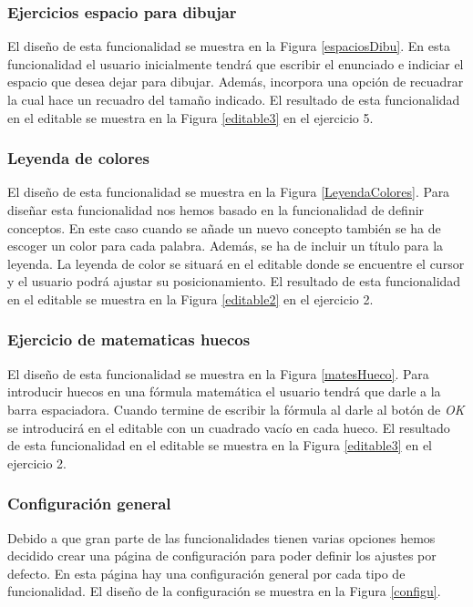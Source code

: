 \subsubsection{Ejercicios espacio para dibujar}
El diseño de esta funcionalidad se muestra en la Figura \ref{espaciosDibu}. En esta funcionalidad el usuario inicialmente tendrá que escribir el enunciado e indiciar el espacio que desea dejar para dibujar. Además, incorpora una opción de recuadrar la cual hace un recuadro del tamaño indicado. El resultado de esta funcionalidad en el editable se muestra en la Figura \ref{editable3} en el ejercicio 5.

\subsubsection{Leyenda de colores}
El diseño de esta funcionalidad se muestra en la Figura \ref{LeyendaColores}. Para diseñar esta funcionalidad nos hemos basado en la funcionalidad de definir conceptos. En este caso cuando se añade un nuevo concepto también se ha de escoger un color para cada palabra. Además, se ha de incluir un título para la leyenda. La leyenda de color se situará en el editable donde se encuentre el cursor y el usuario podrá ajustar su posicionamiento. El resultado de esta funcionalidad en el editable se muestra en la Figura \ref{editable2} en el ejercicio 2.

\subsubsection{Ejercicio de matematicas huecos}
El diseño de esta funcionalidad se muestra en la Figura \ref{matesHueco}. Para introducir huecos en una fórmula matemática el usuario tendrá que darle a la barra espaciadora. Cuando termine de escribir la fórmula al darle al botón de \textit{OK} se introducirá en el editable con un cuadrado vacío en cada hueco. El resultado de esta funcionalidad en el editable se muestra en la Figura \ref{editable3} en el ejercicio 2.

\subsubsection{Configuración general}
Debido a que gran parte de las funcionalidades tienen varias opciones hemos decidido crear una página de configuración para poder definir los ajustes por defecto. En esta página hay una configuración general por cada tipo de funcionalidad. El diseño de la configuración se muestra en la Figura \ref{configu}.


